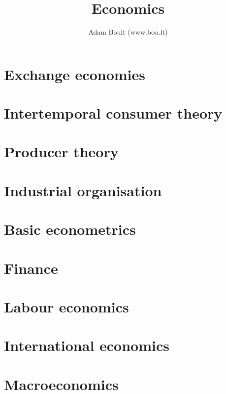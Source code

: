 \documentclass[oneside]{book}
\begin{document}
\author{Adam Boult (www.bou.lt)}
\title{Economics}
\maketitle

\setcounter{tocdepth}{1}
\tableofcontents



\part{Exchange economies}










\part{Intertemporal consumer theory}




\part{Producer theory}









\part{Industrial organisation}







\part{Basic econometrics}






\part{Finance}








\part{Labour economics}



\part{International economics}



\part{Macroeconomics}





\end{document}
